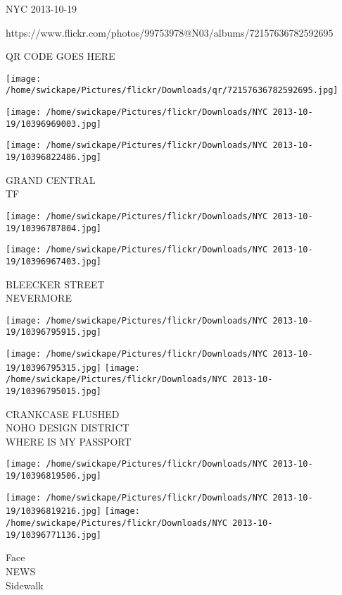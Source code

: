 \documentclass[10pt,letterpaper]{article}
\begin{document}
NYC 2013-10-19

https://www.flickr.com/photos/99753978@N03/albums/72157636782592695

QR CODE GOES HERE

\texttt{[image: /home/swickape/Pictures/flickr/Downloads/qr/72157636782592695.jpg]}
\pagebreak

\texttt{[image: /home/swickape/Pictures/flickr/Downloads/NYC 2013-10-19/10396969003.jpg]}

\vspace{0.25in}
\texttt{[image: /home/swickape/Pictures/flickr/Downloads/NYC 2013-10-19/10396822486.jpg]}

GRAND CENTRAL\\
TF\\
\pagebreak

\texttt{[image: /home/swickape/Pictures/flickr/Downloads/NYC 2013-10-19/10396787804.jpg]}

\vspace{0.25in}
\texttt{[image: /home/swickape/Pictures/flickr/Downloads/NYC 2013-10-19/10396967403.jpg]}

BLEECKER STREET\\
NEVERMORE\\
\pagebreak

\texttt{[image: /home/swickape/Pictures/flickr/Downloads/NYC 2013-10-19/10396795915.jpg]}

\vspace{0.25in}
\texttt{[image: /home/swickape/Pictures/flickr/Downloads/NYC 2013-10-19/10396795315.jpg]}
\texttt{[image: /home/swickape/Pictures/flickr/Downloads/NYC 2013-10-19/10396795015.jpg]}

CRANKCASE FLUSHED\\
NOHO DESIGN DISTRICT\\
WHERE IS MY PASSPORT\\
\pagebreak

\texttt{[image: /home/swickape/Pictures/flickr/Downloads/NYC 2013-10-19/10396819506.jpg]}

\vspace{0.25in}
\texttt{[image: /home/swickape/Pictures/flickr/Downloads/NYC 2013-10-19/10396819216.jpg]}
\texttt{[image: /home/swickape/Pictures/flickr/Downloads/NYC 2013-10-19/10396771136.jpg]}

Face\\
NEWS\\
Sidewalk\\
\pagebreak
\end{document}
